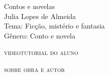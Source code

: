 \documentclass[smaller,professionalfonts,15pt]{beamer}
\begin{document}
										\begin{frame}\begin{raggedleft}
										\Huge 
Contos e novelas						\\
										\huge 
Julia Lopes de Almeida					\\
										\bigskip
										\normalsize
Tema: Ficção, mistério e fantasia		\\	
Gênero: Conto e novela					\\\vfill\hfill
\publishername
										\end{raggedleft}

\end{frame}

\begin{frame}{\textsc{videotutorial do aluno}}
\vspace{-2cm}\begin{figure}
\end{figure}
\end{frame}



\begin{frame}
\hfill\Huge
\textsc{sobre obra e autor}
\end{frame}
\end{document}
